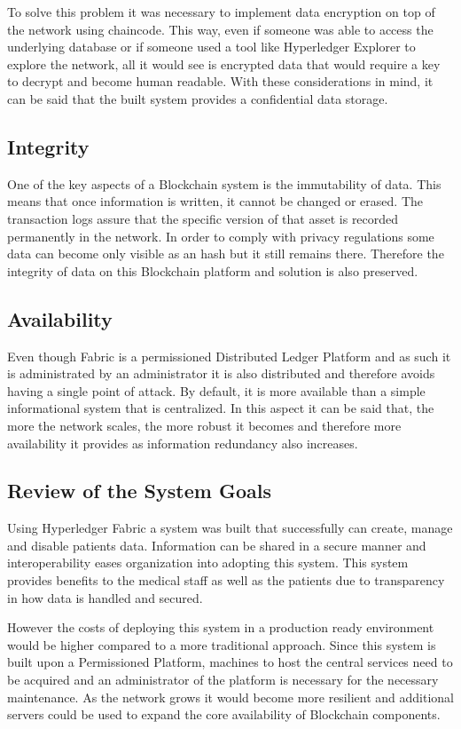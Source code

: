 To solve this problem it was necessary to implement data encryption on top of
the network using chaincode. This way, even if someone was able to access the
underlying database or if someone used a tool like Hyperledger Explorer to
explore the network, all it would see is encrypted data that would require a
key to decrypt and become human readable. With these considerations in mind, it
can be said that the built system provides a confidential data storage.

\subsection{Integrity}

One of the key aspects of a Blockchain system is the immutability of data. This
means that once information is written, it cannot be changed or erased. The
transaction logs assure that the specific version of that asset is recorded
permanently in the network. In order to comply with privacy regulations some
data can become only visible as an hash but it still remains there. Therefore
the integrity of data on this Blockchain platform and solution is also
preserved.

\subsection{Availability}

Even though Fabric is a permissioned Distributed Ledger Platform and as such it
is administrated by an administrator it is also distributed and therefore
avoids having a single point of attack. By default, it is more available than a
simple informational system that is centralized. In this aspect it can be said
that, the more the network scales, the more robust it becomes and therefore
more availability it provides as information redundancy also increases.

\subsection{Review of the System Goals}

Using Hyperledger Fabric a system was built that successfully can create,
manage and disable patients data. Information can be shared in a secure manner
and interoperability eases organization into adopting this system. This system
provides benefits to the medical staff as well as the patients due to
transparency in how data is handled and secured.

However the costs of deploying this system in a production ready environment
would be higher compared to a more traditional approach. Since this system is
built upon a Permissioned Platform, machines to host the central services need
to be acquired and an administrator of the platform is necessary for the
necessary maintenance. As the network grows it would become more resilient and
additional servers could be used to expand the core availability of Blockchain
components.

